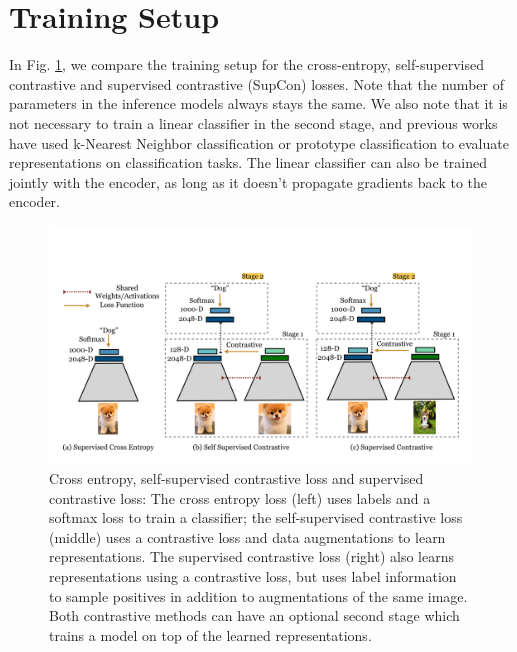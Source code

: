 \section{Training Setup}
In Fig. \ref{fig:teaser2}, we compare the training setup for the cross-entropy, self-supervised contrastive and supervised contrastive (SupCon) losses. Note that the number of parameters in the inference models always stays the same.  We also note that it is not necessary to train a linear classifier in the second stage, and previous works have used k-Nearest Neighbor classification \cite{wu2018unsupervised} or prototype classification to evaluate representations on classification tasks. The linear classifier can also be trained jointly with the encoder, as long as it doesn't propagate gradients back to the encoder. 

\begin{figure}[h]  
 \includegraphics[width=\linewidth]{./figs/teaser_new2}
  \caption{Cross entropy, self-supervised contrastive loss and supervised contrastive loss: The cross entropy loss (left) uses labels and a softmax loss to train a classifier; the self-supervised contrastive loss (middle) uses a contrastive loss and data augmentations to learn representations. The supervised contrastive loss (right) also learns representations using a contrastive loss, but uses label information to sample positives in addition to augmentations of the same image. Both contrastive methods can have an optional second stage which trains a model on top of the learned representations. }
  \label{fig:teaser2}
\end{figure}

